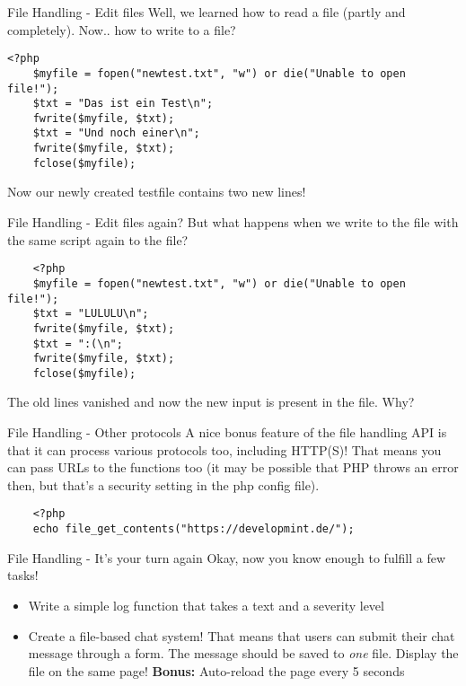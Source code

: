 \begin{frame}[fragile]{File Handling - Edit files}
	Well, we learned how to read a file (partly and completely). Now.. how to write to a file?\pause

\begin{lstlisting}
<?php
	$myfile = fopen("newtest.txt", "w") or die("Unable to open file!");
	$txt = "Das ist ein Test\n";
	fwrite($myfile, $txt);
	$txt = "Und noch einer\n";
	fwrite($myfile, $txt);
	fclose($myfile);
\end{lstlisting} \pause

Now our newly created testfile contains two new lines!
	
\end{frame}

\begin{frame}[fragile]{File Handling - Edit files again?}
	But what happens when we write to the file with the same script again to the file?\pause
	
	\begin{lstlisting}
	<?php
	$myfile = fopen("newtest.txt", "w") or die("Unable to open file!");
	$txt = "LULULU\n";
	fwrite($myfile, $txt);
	$txt = ":(\n";
	fwrite($myfile, $txt);
	fclose($myfile);
	\end{lstlisting} \pause
	
	The old lines vanished and now the new input is present in the file. Why? \pause
	
\end{frame}

\begin{frame}[fragile]{File Handling - Other protocols}
	A nice bonus feature of the file handling API is that it can process various protocols too, including HTTP(S)! That means you can pass URLs to the functions too (it may be possible that PHP throws an error then, but that's a security setting in the php config file).
		\begin{lstlisting}
	<?php
	echo file_get_contents("https://developmint.de/");
	\end{lstlisting} \pause
	
\end{frame}

\begin{frame}[fragile]{File Handling - It's your turn again}
	Okay, now you know enough to fulfill a few tasks!
	
	\begin{itemize}
		\item Write a simple log function that takes a text and a severity level \pause
		\item Create a file-based chat system! That means that users can submit their chat message through a form. The message should be saved to \textit{one} file. Display the file on the same page! \pause \textbf{Bonus:} Auto-reload the page every 5 seconds
	\end{itemize}
	
\end{frame}



